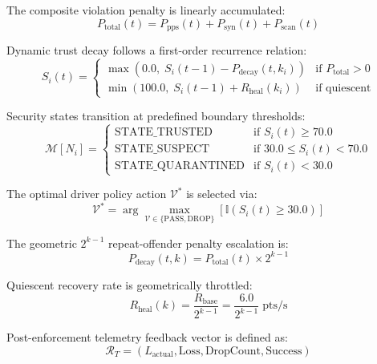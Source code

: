 \documentclass[conference]{IEEEtran}
\begin{document}
The composite violation penalty is linearly accumulated:
\begin{equation}
P_{\text{total}}(t) = P_{\text{pps}}(t) + P_{\text{syn}}(t) + P_{\text{scan}}(t) \label{eq:penalty}
\end{equation}

Dynamic trust decay follows a first-order recurrence relation:
\begin{equation}
S_i(t) = 
\begin{cases}
\max(0.0, \;S_i(t-1) - P_{\text{decay}}(t, k_i)) & \text{if } P_{\text{total}} > 0 \\
\min(100.0, \;S_i(t-1) + R_{\text{heal}}(k_i)) & \text{if quiescent}
\end{cases} \label{eq:score}
\end{equation}

Security states transition at predefined boundary thresholds:
\begin{equation}
\mathcal{M}[N_i] = 
\begin{cases}
\text{STATE\_TRUSTED}     & \text{if } S_i(t) \ge 70.0 \\
\text{STATE\_SUSPECT}     & \text{if } 30.0 \le S_i(t) < 70.0 \\
\text{STATE\_QUARANTINED} & \text{if } S_i(t) < 30.0
\end{cases} \label{eq:transitions}
\end{equation}

The optimal driver policy action $\mathcal{V}^*$ is selected via:
\begin{equation}
\mathcal{V}^* = \arg\max_{\mathcal{V} \in \{\text{PASS}, \text{DROP}\}} \left[\mathbb{I}(S_i(t) \ge 30.0)\right] \label{eq:verdict}
\end{equation}

The geometric $2^{k-1}$ repeat-offender penalty escalation is:
\begin{equation}
P_{\text{decay}}(t, k) = P_{\text{total}}(t) \times 2^{k-1} \label{eq:p_hyst}
\end{equation}

Quiescent recovery rate is geometrically throttled:
\begin{equation}
R_{\text{heal}}(k) = \frac{R_{\text{base}}}{2^{k-1}} = \frac{6.0}{2^{k-1}} \;\text{pts/s} \label{eq:r_hyst}
\end{equation}

Post-enforcement telemetry feedback vector is defined as:
\begin{equation}
\mathcal{R}_T = (L_{\text{actual}}, \text{Loss}, \text{DropCount}, \text{Success}) \label{eq:outcome}
\end{equation}
\end{document}
